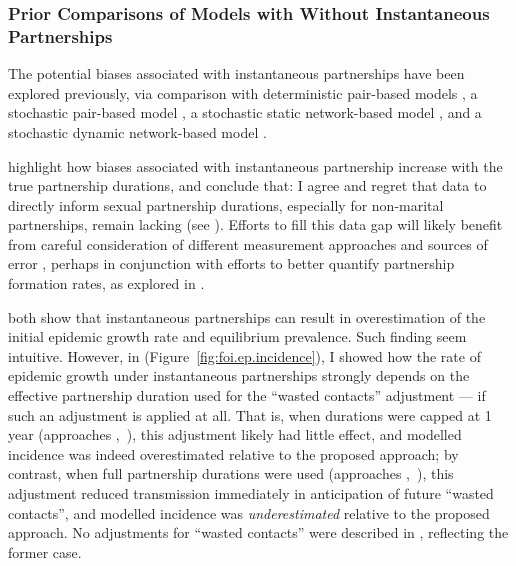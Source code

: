\subsubsection{Prior Comparisons of Models with \vs Without Instantaneous Partnerships}\label{foi.disc.bip.prior}
The potential biases associated with instantaneous partnerships
have been explored previously, via comparison with
deterministic pair-based models \cite{Kretzschmar1998,Eames2002,Lloyd-Smith2004},
a stochastic pair-based model \cite{Eames2002},
a stochastic static network-based model \cite{Eames2002}, and
a stochastic dynamic network-based model \cite{Johnson2016a}.
\par
\citet{Kretzschmar1998} highlight how biases associated with instantaneous partnership
increase with the true partnership durations,
and conclude that: 
I agree and regret that data to directly inform sexual partnership durations,
especially for non-marital partnerships, remain lacking (see ).
Efforts to fill this data gap will likely benefit from careful consideration of
different measurement approaches and sources of error \cite{Burington2010},
perhaps in conjunction with efforts to better quantify partnership formation rates,
as explored in .
\par
\citet{Eames2002,Lloyd-Smith2004} both show that instantaneous partnerships
can result in overestimation of the initial epidemic growth rate and equilibrium prevalence.
Such finding seem intuitive.
However, in  (Figure~\ref{fig:foi.ep.incidence}),
I showed how the rate of epidemic growth under instantaneous partnerships strongly depends
on the effective partnership duration used for the ``wasted contacts'' adjustment
--- if such an adjustment is applied at all.
That is, when durations were capped at 1 year (approaches \ry,~\py),
this adjustment likely had little effect,
and modelled incidence was indeed overestimated relative to the proposed approach;
by contrast, when full partnership durations were used (approaches \rd,~\pd),
this adjustment reduced transmission immediately in anticipation of future ``wasted contacts'',
and modelled incidence was \emph{underestimated} relative to the proposed approach.
No adjustments for ``wasted contacts'' were described in \cite{Eames2002,Lloyd-Smith2004},
reflecting the former case.
